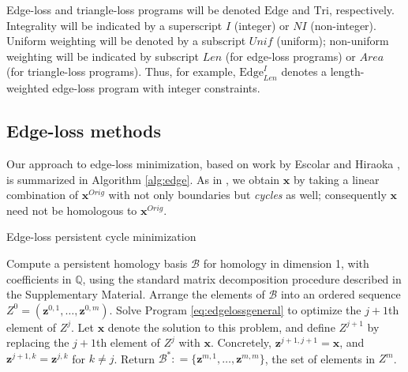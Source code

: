 \documentclass[utf8]{formatting_stuff/frontiersFPHY}
\newcommand{\Q}{\mathbb{Q}}
\newcommand{\originalrep}{\mathbf{x}^{Orig}}
\newcommand{\optimalrep}{\mathbf{x}}
\newcommand{\hcyclebasis}{\mathcal B}
\newcommand{\Edge}{\mathrm{Edge}}
\newcommand{\Tri}{\mathrm{Tri}}
\newcommand{\obasis}{Z} %
\newcommand{\obasisel}{\mathbf{z}}  %
\theoremstyle{plain}
\theoremstyle{definition}
\begin{document}
Edge-loss and triangle-loss programs will be denoted $\Edge$ and $\Tri$, respectively.  Integrality will be indicated by a superscript $I$ (integer) or $NI$ (non-integer).  Uniform weighting will be denoted by a subscript $Unif$ (uniform); non-uniform weighting will be indicated by subscript $Len$ (for edge-loss programs) or $Area$ (for triangle-loss programs).  Thus, for example, $\Edge^{I}_{Len}$ denotes a length-weighted edge-loss program with integer constraints.



\subsection{Edge-loss methods}
\label{sec:edgelossmethods}

 
Our approach to edge-loss minimization, based on work by Escolar and Hiraoka \cite{Escolar2016}, is summarized in Algorithm \ref{alg:edge}.  As in \cite{Escolar2016}, we obtain $\optimalrep$  by taking a linear combination of $\originalrep$ with not only boundaries but \emph{cycles} as well; consequently $\optimalrep$ need not be homologous to $\originalrep$.  
\begin{algorithm}
\caption{Edge-loss persistent cycle minimization}
\label{alg:edge}
\begin{algorithmic}[1]
\STATE Compute a persistent homology basis $\hcyclebasis$ for homology in dimension 1, with coefficients in $\Q$,  using the standard matrix decomposition procedure described in the Supplementary Material. Arrange the elements of $\hcyclebasis$ into an ordered sequence $\obasis^0 = (\obasisel^{0,1}, \ldots, \obasisel^{0,m})$.
\STATE Solve Program \eqref{eq:edgelossgeneral} to optimize the $j+1$th element of $\obasis^{j}$.  Let $\optimalrep$ denote the solution to this problem, and define $\obasis^{j+1}$ by replacing the $j+1$th element of $\obasis^{j}$ with $\optimalrep$.  Concretely, $\obasisel^{j+1,j+1} = \optimalrep$, and $\obasisel^{j+1,k} = \obasisel^{j,k}$ for $k \neq j$.
\ENDFOR
\STATE Return $\hcyclebasis^*: = \{\obasisel^{m,1}, \ldots, \obasisel^{m,m}\}$, the set of elements in $\obasis^m$.
\end{algorithmic}
\end{algorithm}
\end{document}
